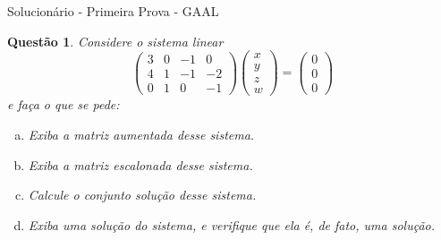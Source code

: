 \documentclass[a4paper,10pt]{article}
\author{Primeira Prova - GAAL}
\date{04 de Abril de 2019}
\title{}
\newtheorem{qst}{Questão}
\begin{document}
\begin{center}
	{\Large{\sc Solucionário - Primeira Prova - GAAL}}
\end{center}

\begin{qst}
	Considere o sistema linear
	\[\begin{pmatrix}
	3&0&-1&0\\4&1&-1&-2\\0&1&0&-1
	\end{pmatrix}\begin{pmatrix}
	x\\y\\z\\w
	\end{pmatrix}=\begin{pmatrix}
	0\\0\\0
	\end{pmatrix}\]e faça o que se pede:
	\begin{enumerate}[a)]
		\item Exiba a matriz aumentada desse sistema.
		\item Exiba a matriz escalonada desse sistema.
		\item Calcule o conjunto solução desse sistema.
		\item Exiba uma solução do sistema, e verifique que ela é, de fato, uma solução.
	\end{enumerate}
\end{qst}
\end{document}
